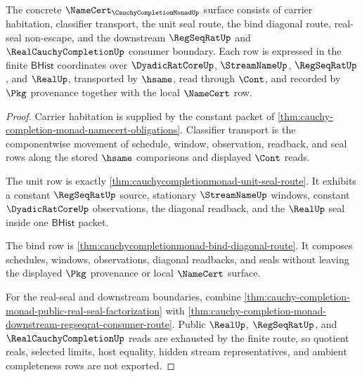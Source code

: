 \begin{theorem}
\label{thm:cauchycompletionmonad-namecert-obligation-surface}
The concrete $\NameCert_{\CauchyCompletionMonadUp}$ surface consists of carrier habitation, classifier transport, the unit seal route, the bind diagonal route, real-seal non-escape, and the downstream $\RegSeqRatUp$ and $\RealCauchyCompletionUp$ consumer boundary. Each row is expressed in the finite $\mathsf{BHist}$ coordinates over $\DyadicRatCoreUp$, $\StreamNameUp$, $\RegSeqRatUp$, and $\RealUp$, transported by $\hsame$, read through $\Cont$, and recorded by $\Pkg$ provenance together with the local $\NameCert$ row.
\end{theorem}
\begin{proof}
Carrier habitation is supplied by the constant packet of \autoref{thm:cauchy-completion-monad-namecert-obligations}. Classifier transport is the componentwise movement of schedule, window, observation, readback, and seal rows along the stored $\hsame$ comparisons and displayed $\Cont$ reads.

The unit row is exactly \autoref{thm:cauchycompletionmonad-unit-seal-route}. It exhibits a constant $\RegSeqRatUp$ source, stationary $\StreamNameUp$ windows, constant $\DyadicRatCoreUp$ observations, the diagonal readback, and the $\RealUp$ seal inside one $\mathsf{BHist}$ packet.

The bind row is \autoref{thm:cauchycompletionmonad-bind-diagonal-route}. It composes schedules, windows, observations, diagonal readbacks, and seals without leaving the displayed $\Pkg$ provenance or local $\NameCert$ surface.

For the real-seal and downstream boundaries, combine \autoref{thm:cauchy-completion-monad-public-real-seal-factorization} with \autoref{thm:cauchy-completion-monad-downstream-regseqrat-consumer-route}. Public $\RealUp$, $\RegSeqRatUp$, and $\RealCauchyCompletionUp$ reads are exhausted by the finite route, so quotient reals, selected limits, host equality, hidden stream representatives, and ambient completeness rows are not exported.
\end{proof}

